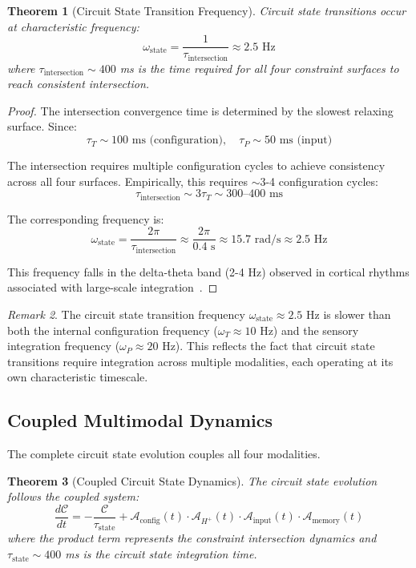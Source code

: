 \documentclass[aps,prd,twocolumn,superscriptaddress,floatfix,nofootinbib]{revtex4-2}
\newtheorem{theorem}{Theorem}[section]
\theoremstyle{remark}
\newtheorem{remark}[theorem]{Remark}
\begin{document}
\begin{theorem}[Circuit State Transition Frequency]
\label{thm:state_frequency}
Circuit state transitions occur at characteristic frequency:
\begin{equation}
\omega_{\text{state}} = \frac{1}{\tau_{\text{intersection}}} \approx 2.5 \text{ Hz}
\end{equation}
where $\tau_{\text{intersection}} \sim 400$ ms is the time required for all four constraint surfaces to reach consistent intersection.
\end{theorem}

\begin{proof}
The intersection convergence time is determined by the slowest relaxing surface. Since:
$$
\tau_T \sim 100 \text{ ms (configuration)}, \quad \tau_P \sim 50 \text{ ms (input)}
$$

The intersection requires multiple configuration cycles to achieve consistency across all four surfaces. Empirically, this requires $\sim 3$-4 configuration cycles:
$$
\tau_{\text{intersection}} \sim 3\tau_T \sim 300\text{--}400 \text{ ms}
$$

The corresponding frequency is:
$$
\omega_{\text{state}} = \frac{2\pi}{\tau_{\text{intersection}}} \approx \frac{2\pi}{0.4 \text{ s}} \approx 15.7 \text{ rad/s} \approx 2.5 \text{ Hz}
$$

This frequency falls in the delta-theta band (2-4 Hz) observed in cortical rhythms associated with large-scale integration~\cite{lakatos2008entrainment}.
\end{proof}

\begin{remark}
The circuit state transition frequency $\omega_{\text{state}} \approx 2.5$ Hz is slower than both the internal configuration frequency ($\omega_T \approx 10$ Hz) and the sensory integration frequency ($\omega_P \approx 20$ Hz). This reflects the fact that circuit state transitions require integration across multiple modalities, each operating at its own characteristic timescale.
\end{remark}

\subsection{Coupled Multimodal Dynamics}

The complete circuit state evolution couples all four modalities.

\begin{theorem}[Coupled Circuit State Dynamics]
\label{thm:consciousness_dynamics}
The circuit state evolution follows the coupled system:
\begin{equation}
\frac{d\mathcal{C}}{dt} = -\frac{\mathcal{C}}{\tau_{\text{state}}} + \mathcal{A}_{\text{config}}(t) \cdot \mathcal{A}_{H^+}(t) \cdot \mathcal{A}_{\text{input}}(t) \cdot \mathcal{A}_{\text{memory}}(t)
\end{equation}
where the product term represents the constraint intersection dynamics and $\tau_{\text{state}} \sim 400$ ms is the circuit state integration time.
\end{theorem}
\end{document}
